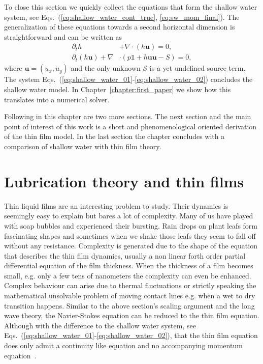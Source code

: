To close this section we quickly collect the equations that form the shallow water system, see Eqs.~(\ref{eq:shallow_water_cont_true}, \ref{eq:sw_mom_final}).
The generalization of these equations towards a second horizontal dimension is straightforward and can be written as~\cite{salmonLatticeBoltzmannMethod1999, dellarNonhydrodynamicModesPriori2002, thommesLatticeBoltzmannMethods2007}
\begin{align}    
        \partial_t h &+ \nabla \cdot (h\mathbf{u}) = 0, \label{eq:shallow_water_01}\\
        \partial_t (h\mathbf{u}) + \nabla&\cdot (p \mathbb{1} + h\mathbf{u}\mathbf{u} - S) = 0, \label{eq:shallow_water_02} 
\end{align}
where $\mathbf{u} = (u_x, u_y)$ and the only unknown $\mathcal{S}$ is a yet undefined source term. 
The system Eqs.~(\ref{eq:shallow_water_01}-\ref{eq:shallow_water_02}) concludes the shallow water model. 
In Chapter~\ref{chapter:first_paper} we show how this translates into a numerical solver.

Following in this chapter are two more sections.
The next section and the main point of interest of this work is a short and phenomenological oriented derivation of the thin film model.
In the last section the chapter concludes with a comparison of shallow water with thin film theory.

\section{Lubrication theory and thin films}
\label{sec:thin_films}
Thin liquid films are an interesting problem to study.
Their dynamics is seemingly easy to explain but bares a lot of complexity.
Many of us have played with soap bubbles and experienced their bursting. 
Rain drops on plant leafs form fascinating shapes and sometimes when we shake those leafs they seem to fall off without any resistance. 
Complexity is generated due to the shape of the equation that describes the thin film dynamics, usually a non linear forth order partial differential equation of the film thickness.
When the thickness of a film becomes small, e.g. only a few tens of nanometers the complexity can even be enhanced. 
Complex behaviour can arise due to thermal fluctuations or strictly speaking the mathematical unsolvable problem of moving contact lines e.g. when a wet to dry transition happens.
Similar to the above section's scaling argument and the long wave theory, the Navier-Stokes equation can be reduced to the thin film equation. 
Although with the difference to the shallow water system, see Eqs.~(\ref{eq:shallow_water_01}-\ref{eq:shallow_water_02}), that the thin film equation does only admit a continuity like equation and no accompanying momentum equation~\cite{oronLongscaleEvolutionThin1997, degennesWettingStaticsDynamics1985, crasterDynamicsStabilityThin2009}.

